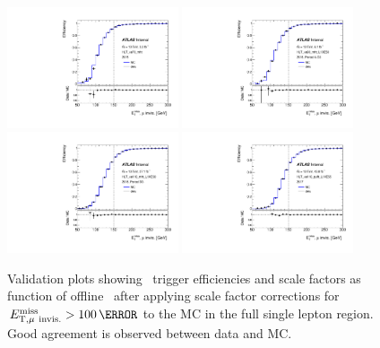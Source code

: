 \begin{figure}[tb!]
	\centering
	\includegraphics[width=0.45\textwidth]{chapters/c6/figures/METTriggerCalibration/validation_HLT_xe70_mht.pdf}
	\includegraphics[width=0.45\textwidth]{chapters/c6/figures/METTriggerCalibration/validation_HLT_xe90_mht_L1XE50.pdf}
	\includegraphics[width=0.45\textwidth]{chapters/c6/figures/METTriggerCalibration/validation_HLT_xe110_mht_L1XE50.pdf}
	\includegraphics[width=0.45\textwidth]{chapters/c6/figures/METTriggerCalibration/validation_HLT_xe110_pufit_L1XE55.pdf}
	\caption{Validation plots showing \MET~trigger efficiencies and scale factors as function of offline \METnomu~after applying scale factor corrections for $\METnomu>100\,\GeV$ to the MC in the full single lepton region. Good agreement is observed between data and MC.}
	\label{fig:TrigSF_validation}
\end{figure}

